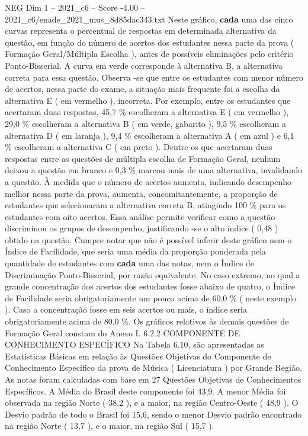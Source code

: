 \begin{textsample}{NEG Dim 1 – 2021\_c6 – Score -4.00 – 2021\_c6/enade\_2021\_mus\_8d85dac343.txt}
Neste gráfico, \textbf{cada} uma das cinco curvas representa o percentual de respostas em determinada alternativa da questão, em função do número de acertos dos estudantes nessa parte da prova ( Formação Geral/Múltipla Escolha ), antes de possíveis eliminações pelo critério Ponto-Bisserial.
A curva em verde corresponde à alternativa B, a alternativa correta para essa questão.
Observa -se que entre os estudantes com menor número de acertos, nessa parte do exame, a situação mais frequente foi a escolha da alternativa E ( em vermelho ), incorreta.
Por exemplo, entre os estudantes que acertaram duas respostas, 45,7 \% escolheram a alternativa E ( em vermelho ), 29,0 \% escolheram a alternativa B ( em verde, gabarito ), 9,5 \% escolheram a alternativa D ( em laranja ), 9,4 \% escolheram a alternativa A ( em azul ) e 6,1 \% escolheram a alternativa C ( em preto ).
Dentre os que acertaram duas respostas entre as questões de múltipla escolha de Formação Geral, nenhum deixou a questão em branco e 0,3 \% marcou mais de uma alternativa, invalidando a questão.
À medida que o número de acertos aumenta, indicando desempenho melhor nessa parte da prova, aumenta, concomitantemente, a proporção de estudantes que selecionaram a alternativa correta B, atingindo 100 \% para os estudantes com oito acertos.
Essa análise permite verificar como a questão discriminou os grupos de desempenho, justificando -se o alto índice ( 0,48 ) obtido na questão.
Cumpre notar que não é possível inferir deste gráfico nem o Índice de Facilidade, que seria uma média da proporção ponderada pela quantidade de estudantes com \textbf{cada} uma das notas, nem o Índice de Discriminação Ponto-Bisserial, por razão equivalente.
No caso extremo, no qual a grande concentração dos acertos dos estudantes fosse abaixo de quatro, o Índice de Facilidade seria obrigatoriamente um pouco acima de 60,0 \% ( neste exemplo ).
Caso a concentração fosse em seis acertos ou mais, o índice seria obrigatoriamente acima de 80,0 \%.
Os gráficos relativos às demais questões de Formação Geral constam do Anexo I. 6.2.2 COMPONENTE DE CONHECIMENTO ESPECÍFICO Na Tabela 6.10, são apresentadas as Estatísticas Básicas em relação às Questões Objetivas do Componente de Conhecimento Específico da prova de Música ( Licenciatura ) por Grande Região.
As notas foram calculadas com base em 27 Questões Objetivas de Conhecimentos Específicos.
A Média do Brasil deste componente foi 43,9.
A menor Média foi observada na região Norte ( 38,2 ), e a maior, na região Centro-Oeste ( 48,9 ).
O Desvio padrão de todo o Brasil foi 15,6, sendo o menor Desvio padrão encontrado na região Norte ( 13,7 ), e o maior, na região Sul ( 15,7 ).

\end{textsample}
